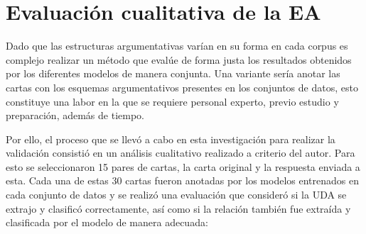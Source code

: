 \documentclass[a4paper,11pt,twocolumn,twoside]{article}
\begin{document}
\begin{table}[h]
	\begin{center}
		\caption{\label{table:comparative_test_abstrct_f1_metrics_segmenter}Métricas comparativas del corpus AbsTRCT.}
	\end{center}
\end{table}

\section{Evaluación cualitativa de la EA}

Dado que las estructuras argumentativas varían en su forma en cada corpus es complejo realizar un método que evalúe de forma 
justa los resultados obtenidos por los diferentes modelos de manera conjunta. Una variante sería anotar las cartas 
con los esquemas argumentativos presentes en los conjuntos de datos, esto constituye una labor en la que se requiere
personal experto, previo estudio y preparación, además de tiempo. 

Por ello, el proceso que se llevó a cabo en esta investigación para realizar la 
validación consistió en un análisis cualitativo realizado a criterio del autor. Para esto se seleccionaron 15 pares 
de cartas, la carta original y la respuesta enviada a esta. Cada una de estas 30 cartas fueron anotadas por los modelos entrenados en cada 
conjunto de datos y se realizó una evaluación que consideró si la UDA se extrajo y clasificó correctamente, 
así como si la relación también fue extraída y clasificada por el modelo de manera adecuada:

\end{document}
